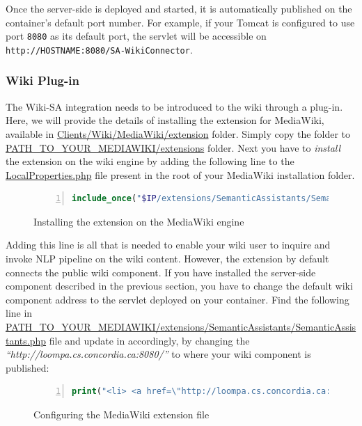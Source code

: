 Once the server-side is deployed and started, it is automatically published on the container's default port number. For example, if your Tomcat is configured to use port \texttt{8080} as its default port, the servlet will be accessible on \texttt{http://HOSTNAME:8080/SA-WikiConnector}.

\subsubsection{Wiki Plug-in}
The Wiki-SA integration needs to be introduced to the wiki through a plug-in. Here, we will provide the details of installing the \sa extension for MediaWiki, available in \url{Clients/Wiki/MediaWiki/extension} folder. Simply copy the \texttt{\sa} folder to \url{PATH_TO_YOUR_MEDIAWIKI/extensions} folder. Next you have to \emph{install} the extension on the wiki engine by adding the following line to the \url{LocalProperties.php} file present in the root of your MediaWiki installation folder.

\begin{figure}[h!]
\centering
\begin{lstlisting}[language=PHP,numbers=left,xleftmargin=4mm,columns=flexible]
include_once("$IP/extensions/SemanticAssistants/SemanticAssistants.php");
\end{lstlisting}
\caption{Installing the \sa extension on the MediaWiki engine}
\label{list:mediawiki_sa_extension_install}
\end{figure}

Adding this line is all that is needed to enable your wiki user to inquire and invoke NLP pipeline on the wiki content. However, the extension by default connects the public \sa wiki component. If you have installed the server-side component described in the previous section, you have to change the default wiki component address to the servlet deployed on your container. Find the following line in \url{PATH_TO_YOUR_MEDIAWIKI/extensions/SemanticAssistants/SemanticAssistants.php} file and update in accordingly, by changing the \emph{``http://loompa.cs.concordia.ca:8080/''} to where your wiki component is published:

\begin{figure}[h!]
\centering
\begin{lstlisting}[language=PHP,numbers=left,xleftmargin=4mm,columns=flexible]
print("<li> <a href=\"http://loompa.cs.concordia.ca:8080/SA-WikiConnector/SemAssistServlet?action=proxy\">Semantic Assistants</a></li>");\end{lstlisting}
\caption{Configuring the \sa MediaWiki extension file}
\label{list:mediawiki_sa_extension_config}
\end{figure}

